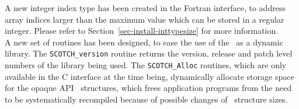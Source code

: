 A new integer index type has been created in the Fortran interface, to
address array indices larger than the maximum value which can be
stored in a regular integer. Please refer to
Section~\ref{sec-install-inttypesize} for more information.
\\

A new set of routines has been designed, to ease the use of the
\libscotch\ as a dynamic library. The \texttt{SCOTCH\_\lbt version}
routine returns the version, release and patch level numbers of the
library being used. The \texttt{SCOTCH\_\lbt *Alloc} routines,
which are only available in the C interface at the time being,
dynamically allocate storage space for the opaque API
\scotch\ structures, which frees application programs from the need
to be systematically recompiled because of possible changes of
\scotch\ structure sizes.
